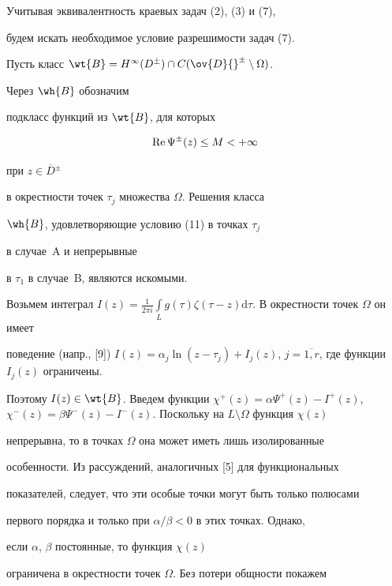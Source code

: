 \begin{pf}


Учитывая эквивалентность краевых задач (2), (3) и (7),


будем искать необходимое условие разрешимости задач (7).


Пусть класс $\wt{B}=H^{\infty}(D^{\pm})\cap


C(\ov{D}{}^{\pm}\setminus \Omega)$.


Через $\wh{B}$ обозначим


подкласс функций из $\wt{B}$, для которых


$$


\re \Psi^{\pm}(z) \le M < +\infty


$$


при $z\in\overline{D}{}^{\pm}$


в окрестности точек $\tau_j$ множества $\Omega$. Решения класса


$\wh{B}$, удовлетворяющие условию (11) в точках $\tau_j$


в случае~A и непрерывные


в $\tau_1$ в случае~B, являются искомыми.





Возьмем интеграл $I(z)=\frac{1}{2\pi i}\int\limits_{L}


g(\tau)\zeta(\tau - z)\mathrm d\tau$. В окрестности точек $\Omega$ он имеет


поведение (напр., [9]) $I(z)=\alpha_{j}\ln(z-\tau_{j})


+I_{j}(z)$, $j=\overline{1,r}$, где функции $I_j(z)$ ограничены.


Поэтому $I(z)\in\wt{B}$. Введем функции $\chi^{+}(z) =


\alpha\Psi^{+}(z) - I^{+}(z)$, $\chi^{-}(z) = \beta \Psi^{-}(z) -


I^{-}(z)$. Поскольку на $L\setminus\Omega$ функция $\chi(z)$


непрерывна, то в точках $\Omega$ она может иметь лишь изолированные


особенности. Из рассуждений, аналогичных [5] для функциональных


показателей, следует, что эти особые точки могут быть только полюсами


первого порядка и только при $\alpha/\beta<0$ в этих точках. Однако,


если $\alpha$, $\beta$ постоянные, то функция $\chi(z)$


ограничена в окрестности точек $\Omega$. Без потери общности покажем



\end{pf}
